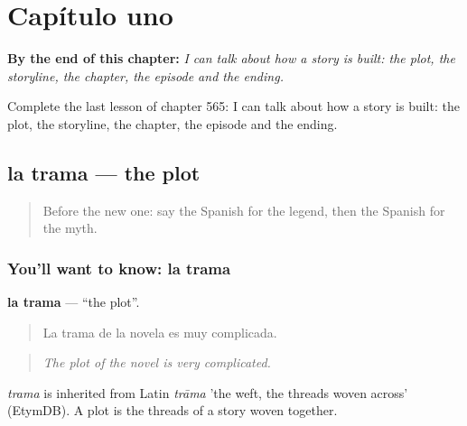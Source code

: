 
\chapter{Capítulo uno}
\label{ch:es-capitulo-uno}

\begin{chapteropening}
\textbf{By the end of this chapter:} \emph{I can talk about how a story is built: the plot, the storyline, the chapter, the episode and the ending.}

Complete the last lesson of chapter 565: I can talk about how a story is built: the plot, the storyline, the chapter, the episode and the ending.
\end{chapteropening}

\section[la trama]{la trama — the plot}

\label{lesson:ES-C565-trama}



\begin{quote}
Before the new one: say the Spanish for the legend, then the Spanish for the myth.
\end{quote}

\subsection*{You'll want to know: la trama}
\textbf{la trama} — \textquotedblleft{}the plot\textquotedblright{}.

\begin{quote}
La trama de la novela es muy complicada.
\end{quote}

\begin{quote}
\emph{The plot of the novel is very complicated.}
\end{quote}

\begin{cousinweb}
\emph{trama} is inherited from Latin \emph{trāma} 'the weft, the threads woven across' (EtymDB). A plot is the threads of a story woven together.
\end{cousinweb}

